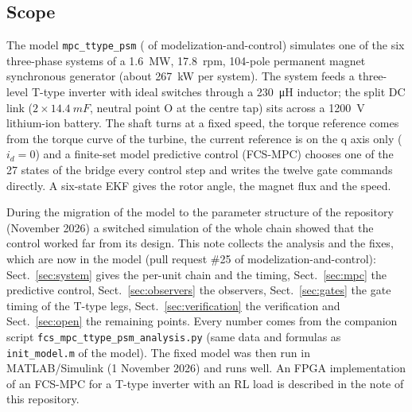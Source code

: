 \documentclass[10pt,a4paper]{scrartcl}
\newcommand{\code}[1]{\texttt{#1}}
\begin{document}

\tableofcontents
\newpage
\begin{onehalfspace}

\section{Scope}
\label{sec:scope}

The model \code{mpc\_ttype\_psm} ( of modelization-and-control) simulates one of the six three-phase systems of a \SI{1.6}{MW}, \SI{17.8}{rpm}, 104-pole permanent magnet synchronous generator (about \SI{267}{kW} per system). The system feeds a three-level T-type inverter with ideal switches through a \SI{230}{\micro H} inductor; the split DC link ($2\times\SI{14.4}{mF}$, neutral point O at the centre tap) sits across a \SI{1200}{V} lithium-ion battery. The shaft turns at a fixed speed, the torque reference comes from the torque curve of the turbine, the current reference is on the q axis only ($i_d = 0$) and a finite-set model predictive control (FCS-MPC) \cite{kouro2009,rodriguez2012} chooses one of the 27 states of the bridge every control step and writes the twelve gate commands directly. A six-state EKF \cite{bolognani1999} gives the rotor angle, the magnet flux and the speed.

During the migration of the model to the parameter structure of the repository (November 2026) a switched simulation of the whole chain showed that the control worked far from its design. This note collects the analysis and the fixes, which are now in the model (pull request \#25 of modelization-and-control): Sect.~\ref{sec:system} gives the per-unit chain and the timing, Sect.~\ref{sec:mpc} the predictive control, Sect.~\ref{sec:observers} the observers, Sect.~\ref{sec:gates} the gate timing of the T-type legs, Sect.~\ref{sec:verification} the verification and Sect.~\ref{sec:open} the remaining points. Every number comes from the companion script \code{fcs\_mpc\_ttype\_psm\_analysis.py} (same data and formulas as \code{init\_model.m} of the model). The fixed model was then run in MATLAB/Simulink (1 November 2026) and runs well. An FPGA implementation of an FCS-MPC for a T-type inverter with an RL load is described in the note  of this repository.


\end{onehalfspace}
\end{document}
